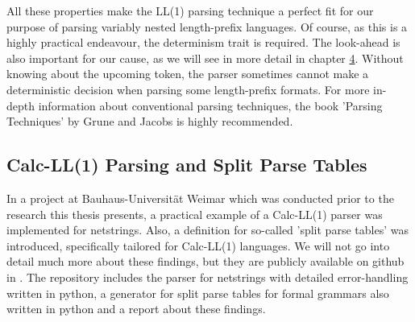 All these properties make the LL(1) parsing technique a perfect fit for our purpose of parsing variably nested length-prefix languages. Of course, as this is a highly practical endeavour, the determinism trait is required. The look-ahead is also important for our cause, as we will see in more detail in chapter \hyperref[4.0]{4}. Without knowing about the upcoming token, the parser sometimes cannot make a deterministic decision when parsing some length-prefix formats. For more in-depth information about conventional parsing techniques, the book 'Parsing Techniques' \cite{Parsing-Techniques-2} by Grune and Jacobs is highly recommended.
\subsection{Calc-LL(1) Parsing and Split Parse Tables}
\label{3.3}
In a project at Bauhaus-Universität Weimar which was conducted prior to the research this thesis presents, a practical example of a Calc-LL(1) parser was implemented for netstrings. Also, a definition for so-called 'split parse tables' was introduced, specifically tailored for Calc-LL(1) languages. We will not go into detail much more about these findings, but they are publicly available on github in \cite{Calc-LL(1)-project}. The repository includes the parser for netstrings with detailed error-handling written in python, a generator for split parse tables for formal grammars also written in python and a report about these findings.
